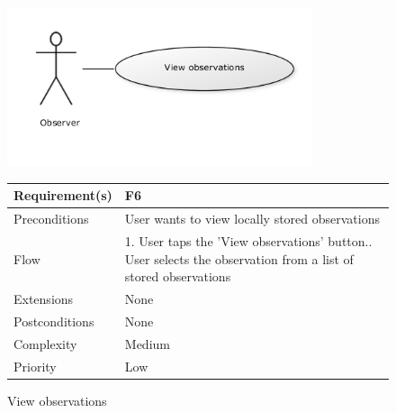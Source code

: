 \begin{figure}
		\centering
		\includegraphics[width=0.8\textwidth]{reqspec/uc/viewobs.png}
		\caption{View observations}
		\label{fig:viewobs}
\begin{tabular}[t]{|l|p{}|}\hline
	Requirement(s)&F6\\\hline
	Preconditions&User wants to view locally stored observations\\\hline
	Flow&1. User taps the 'View observations' button.\newline
	2. User selects the observation from a list of stored observations \\\hline
	Extensions&None \\\hline
	Postconditions&None\\\hline
	Complexity&Medium\\\hline
	Priority&Low\\\hline
\end{tabular}
\end{figure}

\hspace{2em}


